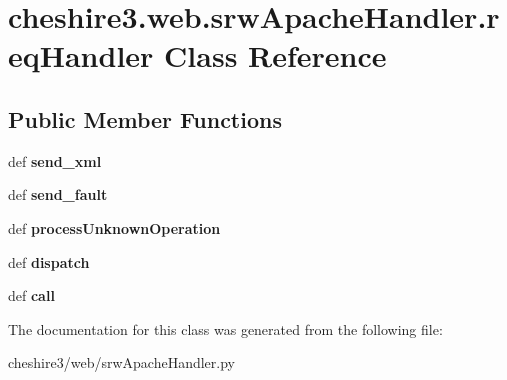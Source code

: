 \hypertarget{classcheshire3_1_1web_1_1srw_apache_handler_1_1req_handler}{\section{cheshire3.\-web.\-srw\-Apache\-Handler.\-req\-Handler Class Reference}
\label{classcheshire3_1_1web_1_1srw_apache_handler_1_1req_handler}
}
\subsection*{Public Member Functions}
\begin{DoxyCompactItemize}
\item 
\hypertarget{classcheshire3_1_1web_1_1srw_apache_handler_1_1req_handler_ade7b55c236fd048ca1b7ea890f3a858c}{def {\bfseries send\-\_\-xml}}\label{classcheshire3_1_1web_1_1srw_apache_handler_1_1req_handler_ade7b55c236fd048ca1b7ea890f3a858c}

\item 
\hypertarget{classcheshire3_1_1web_1_1srw_apache_handler_1_1req_handler_ab2bf0ce042a6c450bdc7e1933ef575d7}{def {\bfseries send\-\_\-fault}}\label{classcheshire3_1_1web_1_1srw_apache_handler_1_1req_handler_ab2bf0ce042a6c450bdc7e1933ef575d7}

\item 
\hypertarget{classcheshire3_1_1web_1_1srw_apache_handler_1_1req_handler_a80b641ced12078b40cb9155d295cac52}{def {\bfseries process\-Unknown\-Operation}}\label{classcheshire3_1_1web_1_1srw_apache_handler_1_1req_handler_a80b641ced12078b40cb9155d295cac52}

\item 
\hypertarget{classcheshire3_1_1web_1_1srw_apache_handler_1_1req_handler_a7a085d310e168b343adfd04d74f8426c}{def {\bfseries dispatch}}\label{classcheshire3_1_1web_1_1srw_apache_handler_1_1req_handler_a7a085d310e168b343adfd04d74f8426c}

\item 
\hypertarget{classcheshire3_1_1web_1_1srw_apache_handler_1_1req_handler_a7051a8bb112b145604a99809d6780397}{def {\bfseries call}}\label{classcheshire3_1_1web_1_1srw_apache_handler_1_1req_handler_a7051a8bb112b145604a99809d6780397}

\end{DoxyCompactItemize}


The documentation for this class was generated from the following file\-:\begin{DoxyCompactItemize}
\item 
cheshire3/web/srw\-Apache\-Handler.\-py\end{DoxyCompactItemize}
